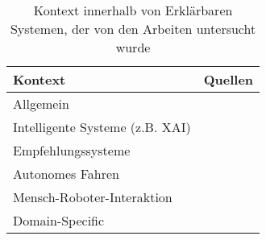 \begin{table}
    \begin{center}
        \begin{tabular}{|p{}|p{}|}
            \hline
            \textbf{Kontext}                    & \textbf{Quellen} \\ \hline
            Allgemein                           &
                \cite{chazette_end-users_nodate} \cite{chazette2020explainability} \cite{chazette_knowledge_nodate} \cite{eiband_impact_2019} \cite{kohl_explainability_2019} \cite{ribera2019can} \cite{lim_2009_assessing} \\
            \hline
            Intelligente Systeme (z.B. XAI)      & 
                \cite{waa_evaluating_2021} \cite{mucha_interfaces_2021} \cite{sokol_explainability_2020}  \cite{abdulrahman_belief-based_2019} \cite{brennen_what_2020} \cite{schaffer_i_2019} \cite{weitz_you_2019} \cite{riveiro_thats_2021} \cite{martin_developing_2019} \cite{martin_evaluating_2021} \cite{rosenfeld_explainability_2019} \cite{cassens_ambient_2019} \cite{cirqueira_scenario-based_2020}  \cite{ehsan_human-centered_2020} \cite{rjoob_towards_2021} \cite{thomson_knowledge--information_2020} \cite{chari_explanation_2020} \cite{sokol_one_2020}  \cite{neerincx_using_2018} \cite{schrills_color_2020} \cite{sovrano_modelling_2020} \cite{gunning2019darpa} \cite{doshi2017towards} \cite{cheng2019explaining}
            \\ \hline
            Empfehlungssysteme                  & 
                \cite{tintarev_designing_nodate} \cite{sato_context_nodate} \cite{balog_measuring_2020}  \cite{kouki_user_2017} \cite{tsai_evaluating_2019} \cite{hernandez-bocanegra_effects_2020} \cite{kunkel_let_2019} \cite{tintarev2015explaining} \cite{sato_action-triggering_2019} \cite{tsai_effects_2020} \cite{nunes_systematic_2017} \cite{tintarev2007survey}
            \\ \hline
            Autonomes Fahren                    &
                \cite{wiegand_id_2020} \cite{haspiel_explanations_2018} \cite{koo_understanding_2016} \cite{koo_why_2015} \cite{wiegand2019drive}
            \\ \hline
            Mensch-Roboter-Interaktion          &
                \cite{stange_effects_2021} \cite{kaptein_personalised_2017} \cite{zolotas_towards_2019} \cite{wang_is_2018} \cite{zhu_effects_2020}
            \\ \hline
            Domain-Specific                     &
                \cite{yamada_evaluating_2016} \cite{zahedi_towards_2019}
            \\ \hline
        \end{tabular}
    \end{center}
    \caption{Kontext innerhalb von Erklärbaren Systemen, der von den Arbeiten untersucht wurde}
    \label{tab:paer_explanation_contexts}
\end{table}

